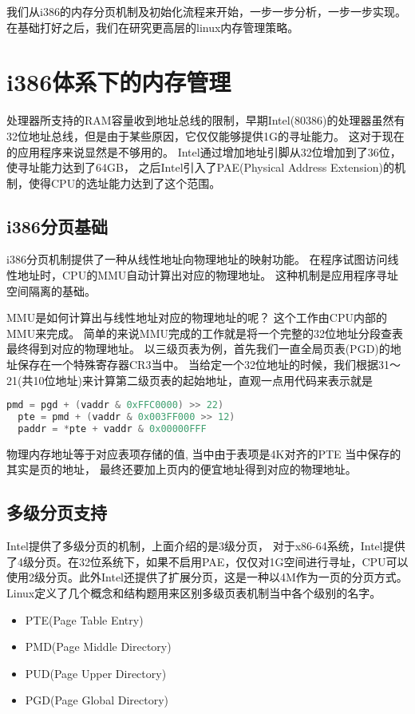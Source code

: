 我们从i386的内存分页机制及初始化流程来开始，一步一步分析，一步一步实现。
在基础打好之后，我们在研究更高层的linux内存管理策略。


\section{i386体系下的内存管理}


处理器所支持的RAM容量收到地址总线的限制，早期Intel(80386)的处理器虽然有32位地址总线，但是由于某些原因，它仅仅能够提供1G的寻址能力。
这对于现在的应用程序来说显然是不够用的。
Intel通过增加地址引脚从32位增加到了36位，使寻址能力达到了64GB， 之后Intel引入了PAE(Physical Address Extension)的机制，使得CPU的选址能力达到了这个范围。

\subsection{i386分页基础}
i386分页机制提供了一种从线性地址向物理地址的映射功能。
在程序试图访问线性地址时，CPU的MMU自动计算出对应的物理地址。 
这种机制是应用程序寻址空间隔离的基础。

MMU是如何计算出与线性地址对应的物理地址的呢？ 这个工作由CPU内部的MMU来完成。
简单的来说MMU完成的工作就是将一个完整的32位地址分段查表最终得到对应的物理地址。
以三级页表为例，首先我们一直全局页表(PGD)的地址保存在一个特殊寄存器CR3当中。
当给定一个32位地址的时候，我们根据31～21(共10位地址)来计算第二级页表的起始地址，直观一点用代码来表示就是\begin{lstlisting}[language=C]
  pmd = pgd + (vaddr & 0xFFC0000) >> 22)
  pte = pmd + (vaddr & 0x003FF000 >> 12)
  paddr = *pte + vaddr & 0x00000FFF
\end{lstlisting}

物理内存地址等于对应表项存储的值, 当中由于表项是4K对齐的PTE 当中保存的其实是页的地址， 最终还要加上页内的便宜地址得到对应的物理地址。

\subsection{多级分页支持}

Intel提供了多级分页的机制，上面介绍的是3级分页， 对于x86-64系统，Intel提供了4级分页。在32位系统下，如果不启用PAE，仅仅对1G空间进行寻址，CPU可以使用2级分页。此外Intel还提供了扩展分页，这是一种以4M作为一页的分页方式。Linux定义了几个概念和结构题用来区别多级页表机制当中各个级别的名字。
\begin{itemize}
  \item PTE(Page Table Entry)
  \item PMD(Page Middle Directory)
  \item PUD(Page Upper Directory)
  \item PGD(Page Global Directory)
\end{itemize}

